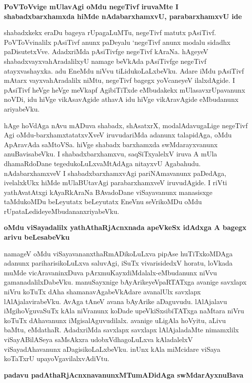 {\bigskip
\noindent
{\large\bf PoVToVvige mUlavAgi oMdu negeTivf iruvaMte I shabadxbarxhamxda hiMde nAdabarxhamxvU, parabarxhamxvU ide}}\label{page199}
\medskip

\noindent
shabadxkekx eraDu bageya rUpagaLuMTu, negeTivf matutx pAsiTivf. PoVToVvinalilx pAsiTivf anunx paDeyalu `negeTivf anunx modalu sidadhx paDisutetxVve. AdadxriMda pAsiTivfge negeTivf kAraNa. hAgeyeV shabadxvayxvahAradalilxyU namage beVkAda pAsiTivfge negeTivf atayxvashayxka. adu EneMdu niVvu tiLidukoLaLxbeVku. Adare iMdu pAsiTivf mAtarx vayxvahAradalilx niMtu, negeTivf bagegx yoVcaneyeV ilalxdAgide. I pAsiTivf heVge heVge meVkapf AgibiTiTxde eMbudakekx mUlasavxrUpavanunx noVDi, idu hiVge vikAsavAgide athavA idu hiVge vikAravAgide eMbudanunx ariyabeVku. 

hAge hoVdAga nAvu mADuva shabadx, shAsatxrX, modalAdavugaLige negeTivf Agi oMdu-barxhamxtatatxvXveV iruvudariMda adanunx talapidAga, oMdu ApAravAda saMtoVSa. hiVge shabadx barxhamxda swMdarayxvanunx anuBavisabeVku. I shabadxbarxhamxvu, saqSiTxyalelxV iruva A mUla dhamaRdoDane tegedukoLuLxvaMtAdAga nitayxvU Agabahudu. nAdabarxhamxveV I shabadxbarxhamxvAgi pariNAmavanunx paDedAga, ivelalxkUkx hiMde mUlaBUtavAgi parabarxhamxveV iruvudAgide. I riVti yathAvatAtxgi kAyaRkAraNa BAvadoDane viSayavanunx manasisxge taMdukoMDu beLeyutatx beLeyutatx EneVnu seVrikoMDu oMdu rUpataLedideyeMbudananxriyabeVku.

{\bigskip
\noindent
{\large\bf oMdu viSayadalilx yathAthaRjAcnxnada apeVkeSx idAdxga A bagegx arivu beLesabeVku}}\label{page200}
\medskip

\noindent
namageV oMdu viSayavananxthaRmADikoLuLxva pipAse huTiTxkoMDAga adanunx pariharisikoLuLxva saluvAgi, iSuTx vivarisidedxV horatu, loVkada muMde vicAravaninxDuva pArxmuKayxdiMdalalx-eMbudanunx niVvu gamanadalilxDabeVku. manuSayxnige bAyArikeyeVpaRTATxga avanige savxlapx niVru koTuTx dAha shamanavAgabeVkAdare avanalUlx savxlapx lAlAjalavirabeVku. AvAga tAneV avana bAyArike aDaguvudu. lAlAjalavu iMgihoVguvaSuTx kAla niVranunx koDade upeVkiSxsibiTATxga naMtara niVru koTuTx dAhavanunx iMgisalAguvudilalx. avanige uLigAla hoVyitu, aLivu baMtu, eMdathaR. AdadxriMda savxlapx savxlapx lAlAjaladaMte nimamxlilx viSayABilASeya saMsAkxra udobxVdhagoLuLxva kAladalelxV viSayadAhavanunx aDagisikoLaLxbeVku. inUnx kAla miMcidare viSaya koTaTxrU upayoVgavilalxvAdiVtu.

\eject

{\bigskip
\noindent
{\large\bf padavu padAthaRjAcnxnavanunxMTumADidAga swMdarAyxnuBava}}\label{page200b}
\medskip

